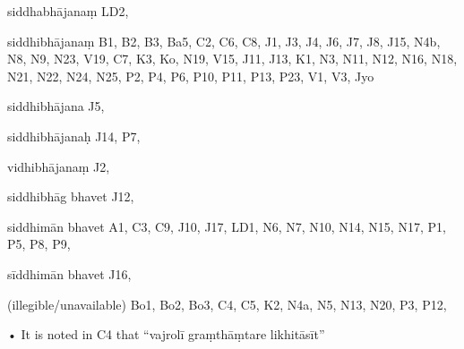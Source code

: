 \begin{marma}[hp03_082]


\item[siddhabhājanaṃ] LD2,
\item[siddhibhājanaṃ] B1, B2, B3, Ba5, C2, C6, C8, J1, J3, J4, J6, J7, J8, J15, N4b, N8, N9, N23, V19, C7, K3, Ko,  N19, V15, J11, J13, K1, N3, N11, N12, N16, N18, N21, N22, N24, N25, P2, P4, P6, P10, P11, P13, P23, V1, V3, Jyo
\item[siddhibhājana] J5,
\item[siddhibhājanaḥ] J14, P7, 
\item[vidhibhājanaṃ] J2,
\item[siddhibhāg bhavet] J12,
\item[siddhimān bhavet] A1, C3, C9, J10, J17, LD1, N6, N7, N10, N14, N15, N17, P1, P5, P8, P9, 
\item[sīddhimān bhavet] J16,
\item[(illegible/unavailable)] Bo1, Bo2, Bo3, C4, C5, K2, N4a, N5, N13, N20, P3, P12, 

  \begin{description}
    • It is noted in C4 that “vajrolī graṃthāṃtare likhitāsīt”
  \end{description}

\end{marma}

